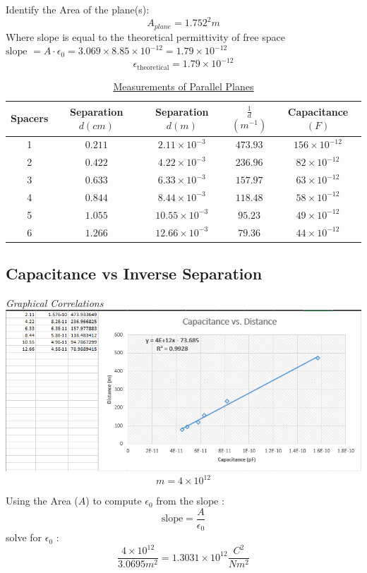 \documentclass{article}
\begin{document}
Identify the Area of the plane(s):
$$A_{plane} = 1.752^{2}m$$
Where slope is equal to the theoretical permittivity of free space $\text{slope } = A \cdot \epsilon_{0} = 3.069 \times 8.85\times10^{-12} = 1.79 \times 10^{-12}$
$$\epsilon_{\text{theoretical}} = 1.79 \times 10^{-12}$$
\vspace{.5cm}
\vfill
\begin{table}
\begin{center}
    \caption*{\underline{Measurements of Parallel Planes}}
    \begin{tabular}{ c| c| c| c |c}
     Spacers & Separation $d(cm)$ & Separation $d(m)$ & $\frac{1}{d}$ $(m^{-1})$ & Capacitance $(F)$\\
     \hline
      1 & $0.211$   &   $2.11\times10^{-3}$   & $473.93$    &  $156\times10^{-12}$  \\ 
      2 & $0.422$   &   $4.22\times10^{-3}$   & $236.96$    &  $82\times10^{-12}$   \\
      3 & $0.633$   &   $6.33\times10^{-3}$   & $157.97$    &  $63\times10^{-12}$   \\
      4 & $0.844$   &   $8.44\times10^{-3}$   & $118.48$    &  $58\times10^{-12}$   \\
      5 & $1.055$   &   $10.55\times10^{-3}$  & $95.23$     &  $49\times10^{-12}$   \\
      6 & $1.266$   &   $12.66\times10^{-3}$  & $79.36$     &  $44\times10^{-12}$   \\
      \hline
    \end{tabular}
\end{center}
\end{table}

\vfill
\begin{center}
    
    \subsection*{Capacitance vs Inverse Separation}
    \textit{Graphical Correlations}
    \includegraphics[scale=.7]{Images/graph.png}
    $$m  = 4 \times 10^{12}$$
\end{center}
\vfill
Using the Area ($A$) to compute $\epsilon_{0}$ from the slope : 
$$\text{slope} = \frac{A}{\epsilon_{0}}$$ 
solve for $\epsilon_{0}$ :
$$\frac{4\times10^{12}}{3.0695m^{2}} = 1.3031 \times 10^{12} \frac{C^{2}}{Nm^{2}} $$
\vfill
\end{document}
